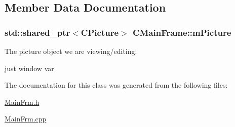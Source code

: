 \subsection{Member Data Documentation}
\hypertarget{class_c_main_frame_aee7250305e9d4adb463024fe090a2c10}{
\subsubsection[{m\+Picture}]{\setlength{\rightskip}{0pt plus 5cm}std\+::shared\+\_\+ptr$<${\bf C\+Picture}$>$ C\+Main\+Frame\+::m\+Picture\hspace{0.3cm}{\ttfamily [protected]}}}\label{class_c_main_frame_aee7250305e9d4adb463024fe090a2c10}


The picture object we are viewing/editing. 

just window var 

The documentation for this class was generated from the following files\+:\begin{DoxyCompactItemize}
\item 
\hyperlink{_main_frm_8h}{Main\+Frm.\+h}\item 
\hyperlink{_main_frm_8cpp}{Main\+Frm.\+cpp}\end{DoxyCompactItemize}
